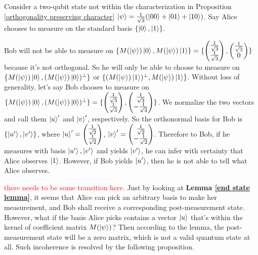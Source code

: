 \begin{example}
Consider a two-qubit state not within the characterization in Proposition \ref{orthogonality preserving character} $\ket{\psi}=\frac{1}{\sqrt{3}}(\ket{00}+\ket{01}+\ket{10})$. Say Alice chooses to measure on the standard basis $\{\ket{0}, \ket{1}\}$.
\end{example}
Bob will not be able to measure on $\{M(\ket{\psi})\ket{0}, M(\ket{\psi})\ket{1}\}=\{\begin{pmatrix}
\frac{1}{\sqrt{3}}\\
\frac{1}{\sqrt{3}}
\end{pmatrix},\begin{pmatrix}
\frac{1}{\sqrt{3}}\\
0
\end{pmatrix}\}$ because it's not orthogonal. So he will only be able to choose to measure on $\{M(\ket{\psi})\ket{0}, (M(\ket{\psi})\ket{0})^\perp \}$ or $\{(M(\ket{\psi})\ket{1})^\perp, M(\ket{\psi})\ket{1} \}$.
Without loss of generality, let's say Bob chooses to measure on $\{M(\ket{\psi})\ket{0}, (M(\ket{\psi})\ket{0})^\perp \}=\{\begin{pmatrix}
\frac{1}{\sqrt{3}}\\
\frac{1}{\sqrt{3}}
\end{pmatrix}, \begin{pmatrix}
\frac{1}{\sqrt{3}}\\
-\frac{1}{\sqrt{3}}
\end{pmatrix}\}$.
We normalize the two vectors and call them $\ket{u}'$ and $\ket{v}'$, respectively. So the orthonormal basis for Bob is $\{\ket{u'}, \ket{v'}\}$, where $\ket{u}'=\begin{pmatrix}
\frac{1}{\sqrt{2}}\\
\frac{1}{\sqrt{2}}
\end{pmatrix}$, $\ket{v}'=\begin{pmatrix}
\frac{1}{\sqrt{2}}\\
-\frac{1}{\sqrt{2}}
\end{pmatrix}$. Therefore to Bob, if he measures with basis $\ket{u'}, \ket{v'}$ and yields $\ket{v'}$, he can infer with certainty that Alice observes $\ket{1}$. However, if Bob yields $\ket{u'}$, then he is not able to tell what Alice observes.

\bigskip
\textcolor{red}{there needs to be some transition here.} Just by looking at \textbf{Lemma \ref{end state lemma}}, it seems that Alice can pick an arbitrary basis to make her measurement, and Bob shall receive a corresponding post-measurement state. However, what if the basis Alice picks contains a vector $\ket{u}$ that's within the kernel of coefficient matrix $M(\ket{\psi})$? Then according to the lemma, the post-measurement state will be a zero matrix, which is not a valid quantum state at all. Such incoherence is resolved by the following proposition.

